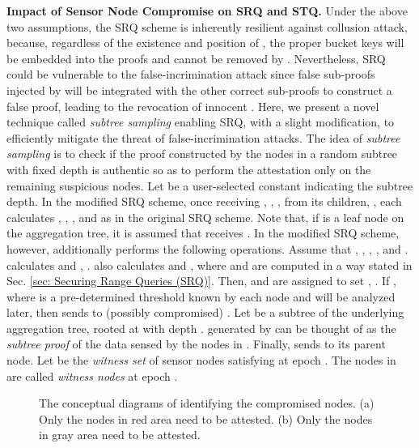 \documentclass[conference]{IEEEtran}
\begin{document}
\textbf{Impact of Sensor Node Compromise on SRQ and STQ.} Under the above two assumptions, the SRQ scheme is inherently resilient against collusion attack, because, regardless of the existence and position of , the proper bucket keys will be embedded into the proofs and cannot be removed by . Nevertheless, SRQ could be vulnerable to the false-incrimination attack since false sub-proofs injected by  will be integrated with the other correct sub-proofs to construct a false proof, leading to the revocation of innocent . Here, we present a novel technique called \emph{subtree sampling} enabling SRQ, with a slight modification, to efficiently mitigate the threat of false-incrimination attacks. The idea of \emph{subtree sampling} is to check if the proof constructed by the nodes in a random subtree with fixed depth is authentic so as to perform the attestation only on the remaining suspicious nodes. Let  be a user-selected constant indicating the subtree depth. In the modified SRQ scheme, once receiving , , , from its  children, , each  calculates , , , and  as in the original SRQ scheme. Note that, if  is a leaf node on the aggregation tree, it is assumed that  receives . In the modified SRQ scheme, however,  additionally performs the following operations. Assume that , , , , and .  calculates  and , .  also calculates  and , where  and  are computed in a way stated in Sec. \ref{sec: Securing Range Queries (SRQ)}. Then,  and  are assigned to set , . If , where  is a pre-determined threshold known by each node and will be analyzed later, then  sends  to (possibly compromised) . Let  be a subtree of the underlying aggregation tree, rooted at  with depth .  generated by  can be thought of as the \emph{subtree proof} of the data sensed by the nodes in . Finally,  sends  to its parent node. Let  be the \emph{witness set} of sensor nodes satisfying  at epoch . The nodes in  are called \emph{witness nodes} at epoch .

\begin{figure}[h]
\centering
{}
\caption{\scriptsize The conceptual diagrams of identifying the compromised nodes. (a) Only the nodes in red area need to be attested. (b) Only the nodes in gray area need to be attested.} \label{fig: diagram}
\end{figure}
\end{document}
